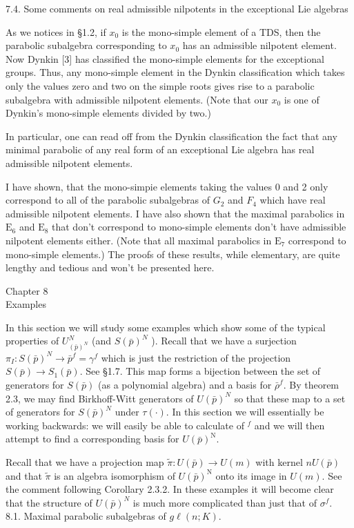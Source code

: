 \documentclass[10pt]{article}
\begin{document}
7.4. Some comments on real admissible nilpotents in the exceptional Lie algebras

As we notices in §1.2, if $x_{0}$ is the mono-simple element of a TDS, then the parabolic subalgebra corresponding to $x_{0}$ has an admissible nilpotent element. Now Dynkin [3] has classified the mono-simple elements for the exceptional groups. Thus, any mono-simple element in the Dynkin classification which takes only the values zero and two on the simple roots gives rise to a parabolic subalgebra with admissible nilpotent elements. (Note that our $x_{0}$ is one of Dynkin's mono-simple elements divided by two.)

In particular, one can read off from the Dynkin classification the fact that any minimal parabolic of any real form of an exceptional Lie algebra has real admissible nilpotent elements.

I have shown, that the mono-simpie elements taking the values 0 and 2 only correspond to all of the parabolic subalgebras of $G_{2}$ and $F_{4}$ which have real admissible nilpotent elements. I have also shown that the maximal parabolics in $\mathrm{E}_{6}$ and $\mathrm{E}_{8}$ that don't correspond to mono-simple elements don't have admissible nilpotent elements either. (Note that all maximal parabolics in $\mathrm{E}_{7}$ correspond to mono-simple elements.) The proofs of these results, while elementary, are quite lengthy and tedious and won't be presented here.

Chapter 8\\
Examples

In this section we will study some examples which show some of the typical properties of $U_{(\bar{p})^{N}}^{N}$ (and $S(\bar{p})^{N}$ ). Recall that we have a surjection $\pi_{I}: S(\bar{p})^{N} \rightarrow \bar{p}^{f}=\gamma^{f}$ which is just the restriction of the projection $S(\bar{p}) \rightarrow S_{1}(\bar{p})$. See §1.7. This map forms a bijection between the set of generators for $S(\bar{p})$ (as a polynomial algebra) and a basis for $\bar{\rho}^{f}$. By theorem 2.3, we may find Birkhoff-Witt generators of $U(\bar{p})^{N}$ so that these map to a set of generators for $S(\bar{p})^{N}$ under $\tau(\cdot)$. In this section we will essentially be working backwards: we will easily be able to calculate of ${ }^{f}$ and we will then attempt to find a corresponding basis for $U(\bar{p})^{\mathrm{N}}$.

Recall that we have a projection map $\tilde{\pi}: U(\bar{p}) \rightarrow U(m)$ with kernel $n U(\bar{p})$ and that $\tilde{\pi}$ is an algebra isomorphism of $U(\bar{p})^{\mathrm{N}}$ onto its image in $U(m)$. See the comment following Corollary 2.3.2. In these examples it will become clear that the structure of $U(\bar{p})^{N}$ is much more complicated than just that of $\sigma^{f}$.\\
8.1. Maximal parabolic subalgebras of $g \ell(n ; K)$.
\end{document}
